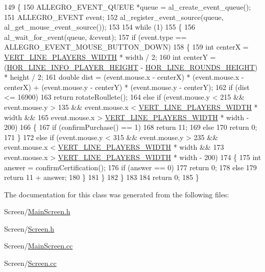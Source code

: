 \begin{DoxyCode}
149 \{
150     ALLEGRO\_EVENT\_QUEUE *queue = al\_create\_event\_queue();
151     ALLEGRO\_EVENT event;
152     al\_register\_event\_source(queue, al\_get\_mouse\_event\_source());
153 
154     \textcolor{keywordflow}{while} (1)
155     \{
156         al\_wait\_for\_event(queue, &event);
157         \textcolor{keywordflow}{if} (event.type == ALLEGRO\_EVENT\_MOUSE\_BUTTON\_DOWN)
158         \{
159             \textcolor{keywordtype}{int} centerX = \hyperlink{MainScreen_8h_a95248267b1e9860a49b38b91d6060ac3}{VERT\_LINE\_PLAYERS\_WIDTH} * width / 2;
160             \textcolor{keywordtype}{int} centerY = (\hyperlink{MainScreen_8h_a317b5109da7c376133ac189c84b42640}{HOR\_LINE\_INFO\_PLAYER\_HEIGHT} - 
      \hyperlink{MainScreen_8h_a7e18b3decda36fa1ea88693a2e3db612}{HOR\_LINE\_ROUNDS\_HEIGHT}) * height / 2;
161             \textcolor{keywordtype}{double} dist = (\textcolor{keyword}{event}.mouse.x - centerX) * (event.mouse.x - centerX) + (\textcolor{keyword}{event}.mouse.y - centerY)
       * (event.mouse.y - centerY);
162             \textcolor{keywordflow}{if} (dist <= 16900)
163                 \textcolor{keywordflow}{return} rotateRoullete();
164             \textcolor{keywordflow}{else} \textcolor{keywordflow}{if} (event.mouse.y < 215 && event.mouse.y > 135 && event.mouse.x < 
      \hyperlink{MainScreen_8h_a95248267b1e9860a49b38b91d6060ac3}{VERT\_LINE\_PLAYERS\_WIDTH} * width && 
165                 event.mouse.x > \hyperlink{MainScreen_8h_a95248267b1e9860a49b38b91d6060ac3}{VERT\_LINE\_PLAYERS\_WIDTH} * width - 200)
166             \{
167                 \textcolor{keywordflow}{if} (confirmPurchase() == 1)
168                     \textcolor{keywordflow}{return} 11;
169                 \textcolor{keywordflow}{else}
170                     \textcolor{keywordflow}{return} 0;
171             \}
172             \textcolor{keywordflow}{else} \textcolor{keywordflow}{if} (event.mouse.y < 315 && event.mouse.y > 235 && event.mouse.x < 
      \hyperlink{MainScreen_8h_a95248267b1e9860a49b38b91d6060ac3}{VERT\_LINE\_PLAYERS\_WIDTH} * width && 
173                 event.mouse.x > \hyperlink{MainScreen_8h_a95248267b1e9860a49b38b91d6060ac3}{VERT\_LINE\_PLAYERS\_WIDTH} * width - 200)
174             \{
175                 \textcolor{keywordtype}{int} answer = confirmCertification();
176                 \textcolor{keywordflow}{if} (answer == 0)
177                     \textcolor{keywordflow}{return} 0;
178                 \textcolor{keywordflow}{else}
179                     \textcolor{keywordflow}{return} 11 + answer;
180             \}
181         \}
182     \}
183 
184     \textcolor{keywordflow}{return} 0;
185 \}
\end{DoxyCode}


The documentation for this class was generated from the following files\-:\begin{DoxyCompactItemize}
\item 
Screen/\hyperlink{MainScreen_8h}{Main\-Screen.\-h}\item 
Screen/\hyperlink{Screen_8h}{Screen.\-h}\item 
Screen/\hyperlink{MainScreen_8cc}{Main\-Screen.\-cc}\item 
Screen/\hyperlink{Screen_8cc}{Screen.\-cc}\end{DoxyCompactItemize}
